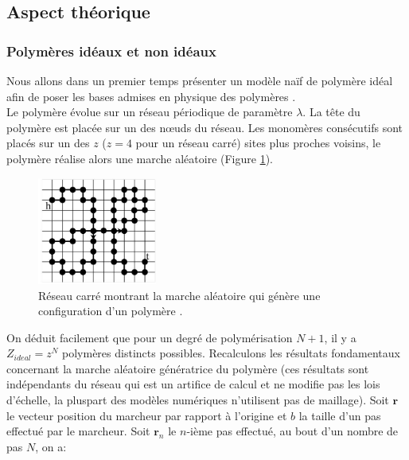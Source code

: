 \documentclass[a4paper,11pt]{article}
\begin{document}
\newpage

\subsection{Aspect théorique}


\subsubsection{Polymères idéaux et non idéaux}
Nous allons dans un premier temps présenter un modèle naïf de polymère idéal afin de poser les bases admises en physique des polymères \cite{sung,these}.\\

Le polymère évolue sur un réseau périodique de paramètre $\lambda$. La tête du polymère est placée sur un des nœuds du réseau. Les monomères consécutifs sont placés sur un des $z$ ($z=4$ pour un réseau carré) sites plus proches voisins, le polymère réalise alors une marche aléatoire (Figure \ref{resideal}).

\begin{figure}[H]
\begin{center}
\includegraphics[width=0.35\textwidth]{resideal.jpg}

\caption{Réseau carré montrant la marche aléatoire qui génère une configuration d'un polymère \cite{these}.}
\label{resideal}
\end{center}
\end{figure}

On déduit facilement que pour un degré de polymérisation $N+1$, il y a $Z_{ideal}=z^N$ polymères distincts possibles. Recalculons les résultats fondamentaux concernant la marche aléatoire génératrice du polymère (ces résultats sont indépendants du réseau qui est un artifice de calcul et ne modifie pas les lois d'échelle, la pluspart des modèles numériques n'utilisent pas de maillage). Soit $\textbf{r}$ le vecteur position du marcheur par rapport à l'origine et $b$ la taille d'un pas effectué par le marcheur. Soit $\textbf{r}_n$ le $n$-ième pas effectué, au bout d'un nombre de pas $N$, on a: 
\end{document}
